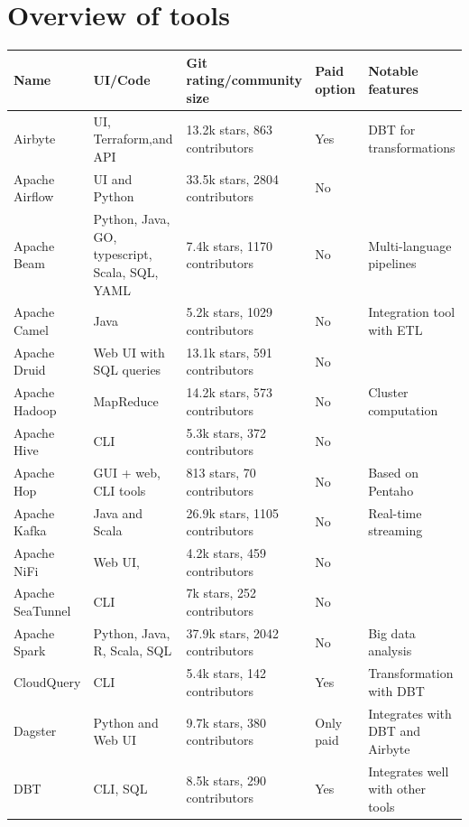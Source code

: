\documentclass[11pt]{article}
\begin{document}
\section{Overview of tools}
\label{appendix:tools}
\begin{table}[H]
\centering
    \begin{tabular}[c]{|p{2cm}|p{4cm}|p{4cm}|p{1.5cm}|p{4cm}|}
    \hline
    \textbf{Name} & \textbf{UI/Code} & \textbf{Git rating/community size} & \textbf{Paid option} & \textbf{Notable features} \\ \hline
    Airbyte & UI, Terraform,and API & 13.2k stars, 863 contributors & Yes & DBT for transformations \\ \hline
    Apache Airflow & UI and Python & 33.5k stars, 2804 contributors & No &  \\ \hline
    Apache Beam & Python, Java, GO, typescript, Scala, SQL, YAML & 7.4k stars, 1170 contributors & No & Multi-language pipelines \\ \hline
    Apache Camel & Java & 5.2k stars, 1029 contributors & No & Integration tool with ETL \\ \hline
    Apache Druid & Web UI with SQL queries & 13.1k stars, 591 contributors & No &  \\ \hline
    Apache Hadoop & MapReduce & 14.2k stars, 573 contributors & No & Cluster computation \\ \hline
    Apache Hive & CLI & 5.3k stars, 372 contributors & No &  \\ \hline
    Apache Hop & GUI + web, CLI tools & 813 stars, 70 contributors & No & Based on Pentaho \\ \hline
    Apache Kafka & Java and Scala & 26.9k stars, 1105 contributors & No & Real-time streaming \\ \hline
    Apache NiFi & Web UI, & 4.2k stars, 459 contributors & No &  \\ \hline
    Apache SeaTunnel & CLI & 7k stars, 252 contributors & No &  \\ \hline
    Apache Spark & Python, Java, R, Scala, SQL & 37.9k stars, 2042 contributors & No & Big data analysis \\ \hline
    CloudQuery & CLI & 5.4k stars, 142 contributors & Yes & Transformation with DBT \\ \hline
    Dagster & Python and Web UI & 9.7k stars, 380 contributors & Only paid & Integrates with DBT and Airbyte \\ \hline
    DBT & CLI, SQL & 8.5k stars, 290 contributors & Yes & Integrates well with other tools \\ \hline

\end{tabular}
\end{table}
\end{document}
